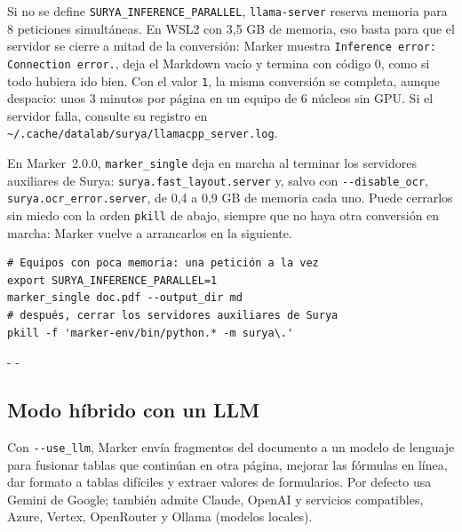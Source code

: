 \documentclass[11pt,a4paper]{article}
\makeatletter
\newcommand{\necesitaespacio}[1]{\par\penalty-100\begingroup
	\setlength{\dimen@}{#1}\dimen@ii\pagegoal\advance\dimen@ii-\pagetotal
	\ifdim\dimen@>\dimen@ii\ifdim\dimen@ii>\z@\vfil\fi\penalty-\@M\fi\endgroup}
\newcommand{\cmd}[1]{\texttt{\textcolor{colcmd}{#1}}}      %
\newcommand{\opt}[1]{\texttt{\textcolor{colopt}{#1}}}      %
\newcommand{\arch}[1]{\texttt{\textcolor{colarch}{#1}}}    %
\newcommand{\val}[1]{\texttt{#1}}                          %
\newcommand{\tl}{\textasciitilde{}}  %
\makeatother
\begin{document}
	\begin{advertencia}
		Si no se define \texttt{SURYA\_\allowbreak{}INFERENCE\_\allowbreak{}PARALLEL}, \cmd{llama-server} reserva memoria para 8 peticiones simultáneas. En WSL2 con 3,5 GB de memoria, eso basta para que el servidor se cierre a mitad de la conversión: Marker muestra \texttt{Inference error: Connection error.}, deja el Markdown vacío y termina con código 0, como si todo hubiera ido bien. Con el valor \val{1}, la misma conversión se completa, aunque despacio: unos 3 minutos por página en un equipo de 6 núcleos sin GPU. Si el servidor falla, consulte su registro en \arch{\tl/\allowbreak{}.cache/\allowbreak{}datalab/\allowbreak{}surya/\allowbreak{}llamacpp\_\allowbreak{}server.log}.

		En Marker~2.0.0, \cmd{marker\_single} deja en marcha al terminar los servidores auxiliares de Surya: \texttt{surya.\allowbreak{}fast\_layout.\allowbreak{}server} y, salvo con \opt{-{}-disable\_ocr}, \texttt{surya.\allowbreak{}ocr\_error.\allowbreak{}server}, de 0,4 a 0,9 GB de memoria cada uno. Puede cerrarlos sin miedo con la orden \cmd{pkill} de abajo, siempre que no haya otra conversión en marcha: Marker vuelve a arrancarlos en la siguiente.
	\end{advertencia}

	\begin{lstlisting}
# Equipos con poca memoria: una petición a la vez
export SURYA_INFERENCE_PARALLEL=1
marker_single doc.pdf --output_dir md
# después, cerrar los servidores auxiliares de Surya
pkill -f 'marker-env/bin/python.* -m surya\.'
\end{lstlisting}
	
	\necesitaespacio{20\baselineskip}
	\subsection{Modo híbrido con un LLM}\label{sec:marker-llm}
	
	Con \opt{-{}-use\_llm}, Marker envía fragmentos del documento a un modelo de lenguaje para fusionar tablas que continúan en otra página, mejorar las fórmulas en línea, dar formato a tablas difíciles y extraer valores de formularios. Por defecto usa Gemini de Google; también admite Claude, OpenAI y servicios compatibles, Azure, Vertex, OpenRouter y Ollama (modelos locales).
	
\end{document}
